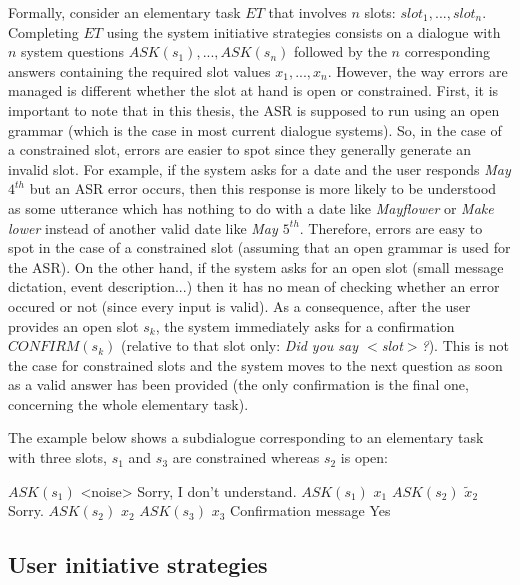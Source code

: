 		Formally, consider an elementary task $ET$ that involves $n$ slots: $slot_1, ..., slot_n$. Completing $ET$ using the system initiative strategies consists on a dialogue with $n$ system questions $ASK(s_1),...,ASK(s_n)$ followed by the $n$ corresponding answers containing the required slot values $x_1,...,x_n$. However, the way errors are managed is different whether the slot at hand is open or constrained. First, it is important to note that in this thesis, the ASR is supposed to run using an open grammar (which is the case in most current dialogue systems). So, in the case of a constrained slot, errors are easier to spot since they generally generate an invalid slot. For example, if the system asks for a date and the user responds \textit{May $4^{th}$} but an ASR error occurs, then this response is more likely to be understood as some utterance which has nothing to do with a date like \textit{Mayflower} or \textit{Make lower} instead of another valid date like \textit{May $5^{th}$}. Therefore, errors are easy to spot in the case of a constrained slot (assuming that an open grammar is used for the ASR). On the other hand, if the system asks for an open slot (small message dictation, event description...) then it has no mean of checking whether an error occured or not (since every input is valid). As a consequence, after the user provides an open slot $s_k$, the system immediately asks for a confirmation $CONFIRM(s_k)$ (relative to that slot only: \textit{Did you say $<$slot$>$?}). This is not the case for constrained slots and the system moves to the next question as soon as a valid answer has been provided (the only confirmation is the final one, concerning the whole elementary task).

                The example below shows a subdialogue corresponding to an elementary task with three slots, $s_1$ and $s_3$ are constrained whereas $s_2$ is open:
		
		\begin{dialogue}
			 $ASK(s_1)$
                         <noise>
			 Sorry, I don't understand. $ASK(s_1)$
			 $x_1$
			 $ASK(s_2)$
                         $\tilde{x}_2$
                         Sorry. $ASK(s_2)$
                         $x_2$
			 $ASK(s_3)$
			 $x_3$
			 Confirmation message
                         Yes
		\end{dialogue}
	
	\subsection{User initiative strategies}
	
